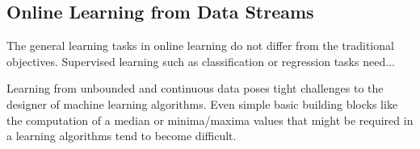 \subsection{\label{sec:onlineLearning}Online Learning from Data Streams}
The general learning tasks in online learning do not differ from the
traditional objectives. Supervised learning such as classification or
regression tasks need... \baustelle

Learning from unbounded and continuous data poses tight challenges to
the designer of machine learning algorithms. Even simple basic
building blocks like the computation of a median or minima/maxima
values that might be required in a learning algorithms tend to become
difficult.







